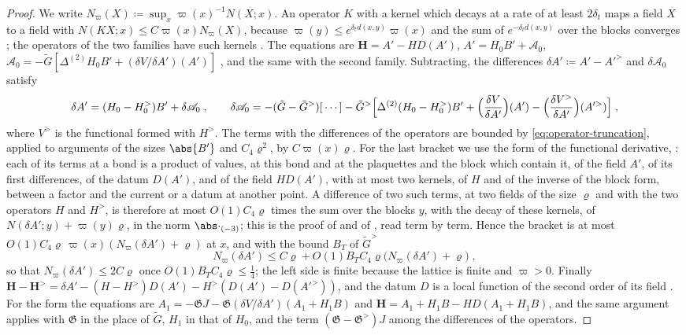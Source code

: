 \begin{proof}
We write $N_\varpi(X) \coloneqq \sup_x\varpi(x)^{-1}N(X; x)$. An operator $K$ with a kernel which decays at a rate of at least $2\delta_t$ maps a field $X$ to a field with $N(KX; x) \leq C\varpi(x)N_\varpi(X)$, because $\varpi(y) \leq e^{\delta_td(x,y)}\varpi(x)$ and the sum of $e^{-\delta_td(x,y)}$ over the blocks converges \cite[(2.58)]{BalabanPRT2}; the operators of the two families have such kernels \cite[(3.42), (3.132), (3.133)]{BalabanPBG}. The equations are $\mathbf H = A' - HD(A')$, $A' = H_0B' + \mathscr A_0$, $\mathscr A_0 = -\tilde G[\Delta^{(2)}H_0B' + (\delta V/\delta A')(A')]$ \cite[(179), (180)]{BalabanVAR}, and the same with the second family. Subtracting, the differences $\delta A' \coloneqq A' - A'^>$ and $\delta\mathscr A_0$ satisfy
\[
    \delta A' = (H_0 - H^>_0)B' + \delta\mathscr A_0\;,
    \qquad
    \delta\mathscr A_0 = -(\tilde G - \tilde G^>)[\,\cdots] - \tilde G^>\Bigl[\Delta^{(2)}(H_0 - H^>_0)B' + \Bigl(\frac{\delta V}{\delta A'}\Bigr)(A') - \Bigl(\frac{\delta V^>}{\delta A'}\Bigr)(A'^>)\Bigr]\;,
\]
where $V^>$ is the functional \cite[(80)]{BalabanVAR} formed with $H^>$. The terms with the differences of the operators are bounded by \eqref{eq:operator-truncation}, applied to arguments of the sizes $\abs{B'}$ and $C_4\varrho^2$, by $C\varpi(x)\varrho$. For the last bracket we use the form of the functional derivative, \cite[(85)--(96)]{BalabanVAR}: each of its terms at a bond is a product of values, at this bond and at the plaquettes and the block which contain it, of the field $A'$, of its first differences, of the datum $D(A')$, and of the field $HD(A')$, with at most two kernels, of $H$ and of the inverse of the block form, between a factor and the current or a datum at another point. A difference of two such terms, at two fields of the size $\varrho$ and with the two operators $H$ and $H^>$, is therefore at most $O(1)C_4\varrho$ times the sum over the blocks $y$, with the decay of these kernels, of $N(\delta A'; y) + \varpi(y)\varrho$, in the norm $\abs\cdot_{(-3)}$; this is the proof of \cite[Proposition~4]{BalabanVAR} and of \cite[(186), (187)]{BalabanVAR}, read term by term. Hence the bracket is at most $O(1)C_4\varrho\,\varpi(x)(N_\varpi(\delta A') + \varrho)$ at $x$, and with the bound $B_T$ of $\tilde G^>$
\[
    N_\varpi(\delta A') \leq C\varrho + O(1)B_TC_4\varrho\bigl(N_\varpi(\delta A') + \varrho\bigr)\;,
\]
so that $N_\varpi(\delta A') \leq 2C\varrho$ once $O(1)B_TC_4\varrho \leq \frac{1}{4}$; the left side is finite because the lattice is finite and $\varpi > 0$. Finally $\mathbf H - \mathbf H^> = \delta A' - (H - H^>)D(A') - H^>(D(A') - D(A'^>))$, and the datum $D$ is a local function of the second order of its field \cite[(44), (54)]{BalabanVAR}. For the form \cite[(111), (112)]{BalabanVAR} the equations are $A_1 = -\mathfrak GJ - \mathfrak G(\delta V/\delta A')(A_1 + H_1B)$ and $\mathbf H = A_1 + H_1B - HD(A_1 + H_1B)$, and the same argument applies with $\mathfrak G$ in the place of $\tilde G$, $H_1$ in that of $H_0$, and the term $(\mathfrak G - \mathfrak G^>)J$ among the differences of the operators.
\end{proof}

